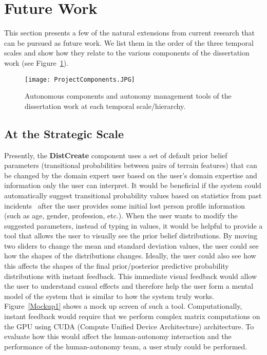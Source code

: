 \section{Future Work}
\label{futurework}

This section presents a few of the natural extensions from current research that can be pursued as future work. We list them in the order of the three temporal scales and show how they relate to the various components of the dissertation work (see Figure~\ref{ProjectComponents2}).

\begin{figure}
\centering
\texttt{[image: ProjectComponents.JPG]}
\caption[Autonomous components and autonomy management tools at each scale]{Autonomous components and autonomy management tools of the dissertation work at each temporal scale/hierarchy.}
\label{ProjectComponents2}
\end{figure}

\subsection{At the Strategic Scale}

Presently, the \textbf{DistCreate} component uses a set of default prior belief parameters (transitional probabilities between pairs of terrain features) that can be changed by the domain expert user based on the user's domain expertise and information only the user can interpret. It would be beneficial if the system could automatically suggest transitional probability values based on statistics from past incidents~\cite{Koester2008Lost} after the user provides some initial lost person profile information (such as age, gender, profession, etc.). When the user wants to modify the suggested parameters, instead of typing in values, it would be helpful to provide a tool that allows the user to visually see the prior belief distributions. By moving two sliders to change the mean and standard deviation values, the user could see how the shapes of the distributions changes. Ideally, the user could also see how this affects the shapes of the final prior/posterior predictive probability distributions with instant feedback. This immediate visual feedback would allow the user to understand causal effects and therefore help the user form a mental model of the system that is similar to how the system truly works. Figure~\ref{Mockup1} shows a mock up screen of such a tool. Computationally, instant feedback would require that we perform complex matrix computations on the GPU using CUDA (Compute Unified Device Architecture) architecture. To evaluate how this would affect the human-autonomy interaction and the performance of the human-autonomy team, a user study could be performed.


